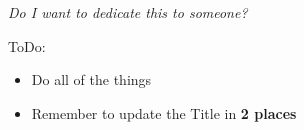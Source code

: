 \thispagestyle{empty}
{}

\vspace*{5cm}

\begin{center}
\textit{Do I want to dedicate this to someone?}


\end{center}

 \color{red}
 \begin{center}
 ToDo:

 \begin{itemize}
     \item Do all of the things
     \item Remember to update the Title in \textbf{2 places}
    
 \end{itemize}
 \end{center}

 \color{black}